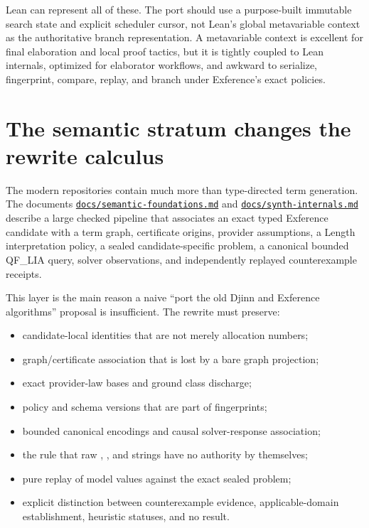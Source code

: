\documentclass[10pt,letterpaper,oneside]{report}
\newcommand{\code}[1]{\texttt{\detokenize{#1}}}
\def\LeantBase{https://github.com/VladimirReshetnikov/Leant/blob/89663ab01d24f61bc017b8c8b1f52c35573082e4/}
\def\DjexBase{https://github.com/VladimirReshetnikov/Djex/blob/43ec4f70b7540bbb76cb1bb72d9e5c4329cafe7f/}
\newcommand{\lpath}[1]{\href{\LeantBase#1}{\nolinkurl{#1}}}
\newcommand{\dpath}[1]{\href{\DjexBase#1}{\nolinkurl{#1}}}
\begin{document}
Lean can represent all of these. The port should use a purpose-built immutable search state and explicit scheduler cursor, not Lean's global metavariable context as the authoritative branch representation. A metavariable context is excellent for final elaboration and local proof tactics, but it is tightly coupled to Lean internals, optimized for elaborator workflows, and awkward to serialize, fingerprint, compare, replay, and branch under Exference's exact policies.

\section{The semantic stratum changes the rewrite calculus}

The modern repositories contain much more than type-directed term generation. The documents \dpath{docs/semantic-foundations.md} and \lpath{docs/synth-internals.md} describe a large checked pipeline that associates an exact typed Exference candidate with a term graph, certificate origins, provider assumptions, a Length interpretation policy, a sealed candidate-specific problem, a canonical bounded QF\_LIA query, solver observations, and independently replayed counterexample receipts.

This layer is the main reason a naive ``port the old Djinn and Exference algorithms'' proposal is insufficient. The rewrite must preserve:

\begin{itemize}
  \item candidate-local identities that are not merely allocation numbers;
  \item graph/certificate association that is lost by a bare graph projection;
  \item exact provider-law bases and ground class discharge;
  \item policy and schema versions that are part of fingerprints;
  \item bounded canonical encodings and causal solver-response association;
  \item the rule that raw \code{sat}, \code{unsat}, and \code{unknown} strings have no authority by themselves;
  \item pure replay of model values against the exact sealed problem;
  \item explicit distinction between counterexample evidence, applicable-domain establishment, heuristic statuses, and no result.
\end{itemize}
\end{document}
